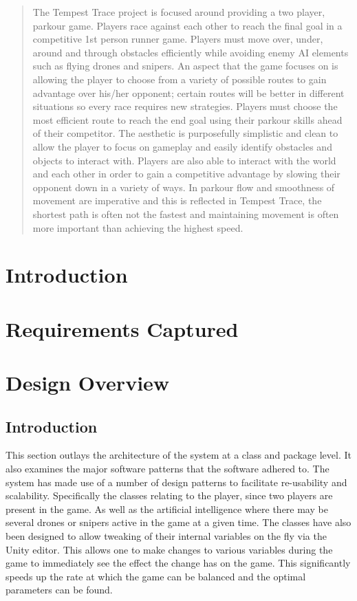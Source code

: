 \documentclass[11pt,a4paper]{article}
\begin{document}
\begin{abstract}
 The Tempest Trace project is focused around providing a two player, parkour game. Players race against each other to reach the final goal in a competitive 1st person runner game. Players must move over, under, around and through obstacles efficiently while avoiding enemy AI elements such as flying drones and snipers. An aspect that the game focuses on is allowing the player to choose from a variety of possible routes to gain advantage over his/her opponent; certain routes will be better in different situations so every race requires new strategies.  Players must choose the most efficient route to reach the end goal using their parkour skills ahead of their competitor. The aesthetic is purposefully simplistic and clean to allow the player to focus on gameplay and easily identify obstacles and objects to interact with. Players are also able to interact with the world and each other in order to gain a competitive advantage by slowing their opponent down in a variety of ways. In parkour flow and smoothness of movement are imperative and this is reflected in Tempest Trace, the shortest path is often not the fastest and maintaining movement is often more important than achieving the highest speed.
\end{abstract}

\section{Introduction}
\label{ss:introduction}

\section{Requirements Captured}

\section{Design Overview}
\label{ss:design-overview}
\subsection{Introduction}
This section outlays the architecture of the system at a class and package level. It also examines the major software patterns that the software adhered to. The system has made use of a number of design patterns to facilitate re-usability and scalability. Specifically the classes relating to the player, since two players are present in the game. As well as the artificial intelligence where there may be several drones or snipers active in the game at a given time. The classes have also been designed to allow tweaking of their internal variables on the fly via the Unity editor. This allows one to make changes to various variables during the game to immediately see the effect the change has on the game. This significantly speeds up the rate at which the game can be balanced and the optimal parameters can be found.
\end{document}
